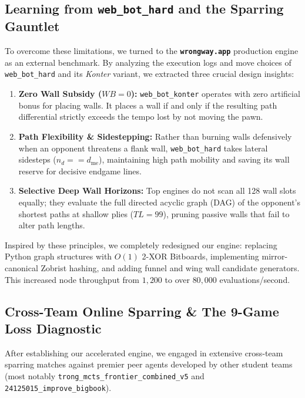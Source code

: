 \subsection{Learning from \texttt{web\_bot\_hard} and the Sparring Gauntlet}
To overcome these limitations, we turned to the \textbf{\texttt{wrongway.app}} production engine as an external benchmark. By analyzing the execution logs and move choices of \texttt{web\_bot\_hard} and its \textit{Konter} variant, we extracted three crucial design insights:
\begin{enumerate}[leftmargin=1.5em]
    \item \textbf{Zero Wall Subsidy ($WB = 0$):} \texttt{web\_bot\_konter} operates with zero artificial bonus for placing walls. It places a wall if and only if the resulting path differential strictly exceeds the tempo lost by not moving the pawn.
    \item \textbf{Path Flexibility \& Sidestepping:} Rather than burning walls defensively when an opponent threatens a flank wall, \texttt{web\_bot\_hard} takes lateral sidesteps ($n_d == d_{\text{me}}$), maintaining high path mobility and saving its wall reserve for decisive endgame lines.
    \item \textbf{Selective Deep Wall Horizons:} Top engines do not scan all 128 wall slots equally; they evaluate the full directed acyclic graph (DAG) of the opponent's shortest paths at shallow plies ($TL = 99$), pruning passive walls that fail to alter path lengths.
\end{enumerate}

Inspired by these principles, we completely redesigned our engine: replacing Python graph structures with $O(1)$ 2-XOR Bitboards, implementing mirror-canonical Zobrist hashing, and adding funnel and wing wall candidate generators. This increased node throughput from $1,200$ to over $80,000$ evaluations/second.

\subsection{Cross-Team Online Sparring \& The 9-Game Loss Diagnostic}
After establishing our accelerated engine, we engaged in extensive cross-team sparring matches against premier peer agents developed by other student teams (most notably \texttt{trong\_mcts\_frontier\_combined\_v5} and \texttt{24125015\_improve\_bigbook}).

